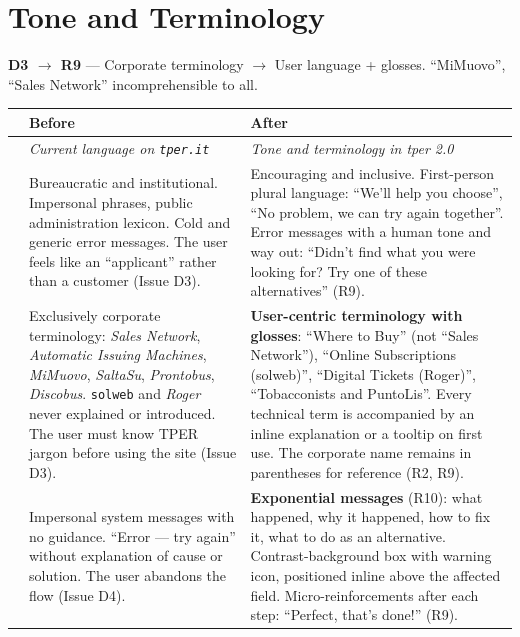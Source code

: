 \vspace{0.3cm}

\section{Tone and Terminology}
\label{sec:comparison-tone}

\textbf{D3 $\rightarrow$ R9} --- Corporate terminology $\rightarrow$ User language + glosses. ``MiMuovo'', ``Sales Network'' incomprehensible to all.

\begin{table}[H]
\centering
\small
\renewcommand{\arraystretch}{1.4}
\begin{tabular}{|p{0.5cm}|p{7cm}|p{7cm}|}
\hline
& \textbf{Before} & \textbf{After} \\ \hline
\cellcolor{primaryColor!15} &
\textit{Current language on \texttt{tper.it}} &
\textit{Tone and terminology in tper 2.0} \\ \hline

\raisebox{0.5cm}{\rotatebox{90}{\textbf{Tone}}} &
Bureaucratic and institutional. Impersonal phrases, public administration lexicon. Cold and generic error messages. The user feels like an ``applicant'' rather than a customer (Issue D3). &
Encouraging and inclusive. First-person plural language: ``We'll help you choose'', ``No problem, we can try again together''. Error messages with a human tone and way out: ``Didn't find what you were looking for? Try one of these alternatives'' (R9). \\ \hline

\raisebox{0.5cm}{\rotatebox{90}{\textbf{Terms}}} &
Exclusively corporate terminology: \textit{Sales Network}, \textit{Automatic Issuing Machines}, \textit{MiMuovo}, \textit{SaltaSu}, \textit{Prontobus}, \textit{Discobus}. \texttt{solweb} and \textit{Roger} never explained or introduced. The user must know TPER jargon before using the site (Issue D3). &
\textbf{User-centric terminology with glosses}: ``Where to Buy'' (not ``Sales Network''), ``Online Subscriptions (solweb)'', ``Digital Tickets (Roger)'', ``Tobacconists and PuntoLis''. Every technical term is accompanied by an inline explanation or a tooltip on first use. The corporate name remains in parentheses for reference (R2, R9). \\ \hline

\raisebox{0.5cm}{\rotatebox{90}{\textbf{Messages}}} &
Impersonal system messages with no guidance. ``Error --- try again'' without explanation of cause or solution. The user abandons the flow (Issue D4). &
\textbf{Exponential messages} (R10): what happened, why it happened, how to fix it, what to do as an alternative. Contrast-background box with warning icon, positioned inline above the affected field. Micro-reinforcements after each step: ``Perfect, that's done!'' (R9). \\ \hline


\end{tabular}
\end{table}
